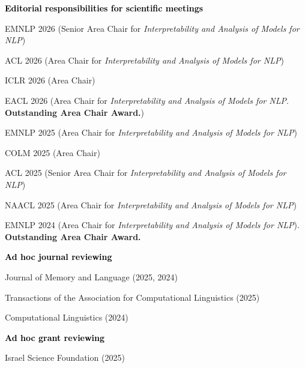 \documentclass[10pt]{article}
\renewcommand{\subsection}[1]{\textcolor{black}{#1}}
\newcommand{\halfblankline}{\quad\vspace{-0.5\baselineskip}\pagebreak[3]}
\begin{document}
	\halfblankline

	\subsection{\textbf{Editorial responsibilities for scientific meetings}}
	\begin{innerlist}[itemsep=0pt]
	\item EMNLP 2026 (Senior Area Chair for \emph{Interpretability and Analysis of Models for NLP})
	\item ACL 2026 (Area Chair for \emph{Interpretability and Analysis of Models for NLP})
	\item ICLR 2026 (Area Chair)
	\item EACL 2026 (Area Chair for \emph{Interpretability and Analysis of Models for NLP}. \textbf{\textcolor{accent}{Outstanding Area Chair Award.}})
	\item EMNLP 2025 (Area Chair for \emph{Interpretability and Analysis of Models for NLP})
	\item COLM 2025 (Area Chair)
	\item ACL 2025 (Senior Area Chair for \emph{Interpretability and Analysis of Models for NLP})
	\item NAACL 2025 (Area Chair for \emph{Interpretability and Analysis of Models for NLP})
	\item EMNLP 2024 (Area Chair for \emph{Interpretability and Analysis of Models for NLP}). \textbf{\textcolor{accent}{Outstanding Area Chair Award.}}
	\end{innerlist}

	\halfblankline

	\subsection{\textbf{Ad hoc journal reviewing}}
	\begin{innerlist}[itemsep=0pt]
	\item Journal of Memory and Language (2025, 2024)
	\item Transactions of the Association for Computational Linguistics (2025)
	\item Computational Linguistics (2024)
	\end{innerlist}

	\halfblankline

	\subsection{\textbf{Ad hoc grant reviewing}}
	\begin{innerlist}[itemsep=0pt]
	\item Israel Science Foundation (2025)
	\end{innerlist}
\end{document}

